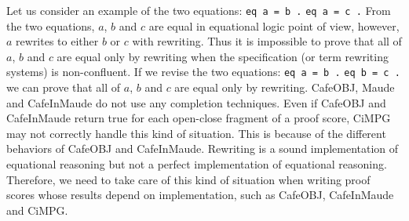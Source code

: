 \documentclass[a4paper,fleqn]{cas-dc}
\begin{document}
Let us consider an example of the two equations: \verb!eq a = b .! \verb!eq a = c .!
From the two equations, $a$, $b$ and $c$ are equal in equational logic point of view, however, $a$ rewrites to either $b$ or $c$ with rewriting. 
Thus it is impossible to prove that all of $a$, $b$ and $c$ are equal only by rewriting when the specification (or term rewriting systems) is non-confluent. If we revise the two equations:
\verb!eq a = b .! \verb!eq b = c .!
we can prove that all of $a$, $b$ and $c$ are equal only by rewriting. CafeOBJ, Maude and CafeInMaude do not use any completion techniques. Even if CafeOBJ and CafeInMaude return true for each open-close fragment of a proof score, CiMPG may not correctly handle this kind of situation. This is because of the different behaviors of CafeOBJ and CafeInMaude. Rewriting is a sound implementation of equational reasoning but not a perfect implementation of equational reasoning. Therefore, we need to take care of this kind of situation when writing proof scores whose results depend on implementation, such as CafeOBJ, CafeInMaude and CiMPG.
\end{document}
